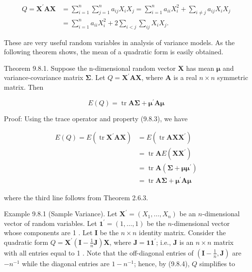 \begin{align*}
Q=\mathbf{X}^{\prime} \mathbf{A X} & =\sum_{i=1}^{n} \sum_{j=1}^{n} a_{i j} X_{i} X_{j}=\sum_{i=1}^{n} a_{i i} X_{i}^{2}+\sum_{i \neq j} a_{i j} X_{i} X_{j}  \tag{9.8.4}\\
& =\sum_{i=1}^{n} a_{i i} X_{i}^{2}+2 \sum_{i<j} \sum_{i j} X_{i} X_{j} . \tag{9.8.5}
\end{align*}


These are very useful random variables in analysis of variance models. As the following theorem shows, the mean of a quadratic form is easily obtained.

Theorem 9.8.1. Suppose the n-dimensional random vector $\mathbf{X}$ has mean $\boldsymbol{\mu}$ and variance-covariance matrix $\boldsymbol{\Sigma}$. Let $Q=\mathbf{X}^{\prime} \mathbf{A X}$, where $\mathbf{A}$ is a real $n \times n$ symmetric matrix. Then


\begin{equation*}
E(Q)=\operatorname{tr} \mathbf{A} \boldsymbol{\Sigma}+\boldsymbol{\mu}^{\prime} \mathbf{A} \boldsymbol{\mu} \tag{9.8.6}
\end{equation*}


Proof: Using the trace operator and property (9.8.3), we have

$$
\begin{aligned}
E(Q)=E\left(\operatorname{tr} \mathbf{X}^{\prime} \mathbf{A X}\right) & =E\left(\operatorname{tr} \mathbf{A} \mathbf{X} \mathbf{X}^{\prime}\right) \\
& =\operatorname{tr} \mathbf{A} E\left(\mathbf{X X}^{\prime}\right) \\
& =\operatorname{tr} \mathbf{A}\left(\boldsymbol{\Sigma}+\boldsymbol{\mu} \boldsymbol{\mu}^{\prime}\right) \\
& =\operatorname{tr} \mathbf{A} \boldsymbol{\Sigma}+\boldsymbol{\mu}^{\prime} \mathbf{A} \boldsymbol{\mu}
\end{aligned}
$$

where the third line follows from Theorem 2.6.3.

Example 9.8.1 (Sample Variance). Let $\mathbf{X}^{\prime}=\left(X_{1}, \ldots, X_{n}\right)$ be an $n$-dimensional vector of random variables. Let $\mathbf{1}^{\prime}=(1, \ldots, 1)$ be the $n$-dimensional vector whose components are 1 . Let $\mathbf{I}$ be the $n \times n$ identity matrix. Consider the quadratic form $Q=\mathbf{X}^{\prime}\left(\mathbf{I}-\frac{1}{n} \mathbf{J}\right) \mathbf{X}$, where $\mathbf{J}=\mathbf{1 1}^{\prime}$; i.e., $\mathbf{J}$ is an $n \times n$ matrix with all entries equal to 1 . Note that the off-diagonal entries of $\left(\mathbf{I}-\frac{1}{n}, \mathbf{J}\right)$ are $-n^{-1}$ while the diagonal entries are $1-n^{-1}$; hence, by (9.8.4), $Q$ simplifies to


